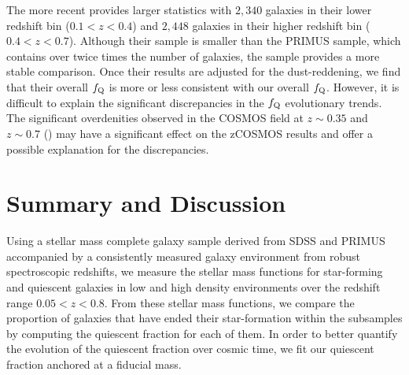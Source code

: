 \documentclass{emulateapj}
\begin{document}
The more recent \cite{Kovac:2014aa} provides larger statistics with
$2,340$ galaxies in their lower redshift bin ($0.1 < z < 0.4$) and
$2,448$ galaxies in their higher redshift bin ($0.4 < z <
0.7$). Although their sample is smaller than the PRIMUS sample, which
contains over twice times the number of galaxies, the
\cite{Kovac:2014aa} sample provides a more stable comparison.  Once
their results are adjusted for the dust-reddening, we
find that their overall $f_{\rm{Q}}$ is more or less consistent with
our overall $f_{\rm{Q}}$. However, it is difficult to explain the
significant discrepancies in the $f_{\rm{Q}}$ evolutionary trends.
The significant overdenities observed in the COSMOS field at $z \sim 0.35$ and $z \sim 0.7$ (\citealt{Lilly:2009aa, Kovac:2010ab}) may have a significant effect on the zCOSMOS results and offer a possible explanation for the discrepancies. 

\section{Summary and Discussion} \label{sec:summary}
Using a stellar mass complete galaxy sample derived from SDSS and
PRIMUS accompanied by a consistently measured galaxy environment from
robust spectroscopic redshifts, we measure the stellar mass functions
for star-forming and quiescent galaxies in low and high density
environments over the redshift range $0.05 < z < 0.8$. From these
stellar mass functions, we compare the proportion of galaxies that
have ended their star-formation within the subsamples by computing the
quiescent fraction for each of them. In order to better quantify the
evolution of the quiescent fraction over cosmic time, we fit our
quiescent fraction anchored at a fiducial mass. 
\end{document}
